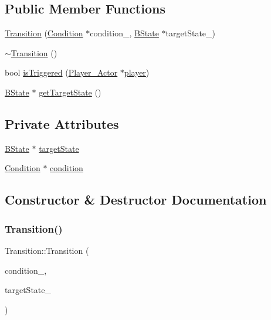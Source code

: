 \subsection*{Public Member Functions}
\begin{DoxyCompactItemize}
\item 
\hyperlink{classTransition_a6997753f6e393f5ec99fbabd693ad78e}{Transition} (\hyperlink{classCondition}{Condition} $\ast$condition\+\_\+, \hyperlink{classBState}{B\+State} $\ast$target\+State\+\_\+)
\item 
\hyperlink{classTransition_ab66e8623f23c71cd4f07c69596427bab}{$\sim$\+Transition} ()
\item 
bool \hyperlink{classTransition_a9c527feeff2364f489b022de20f8cc2d}{is\+Triggered} (\hyperlink{classPlayer__Actor}{Player\+\_\+\+Actor} $\ast$\hyperlink{game__play__state_8cpp_ac65a4bc85dcd7c1cefbc84425f42fc46}{player})
\item 
\hyperlink{classBState}{B\+State} $\ast$ \hyperlink{classTransition_adf0f4f0f2db192bb9fd83ba5e067e0e6}{get\+Target\+State} ()
\end{DoxyCompactItemize}
\subsection*{Private Attributes}
\begin{DoxyCompactItemize}
\item 
\hyperlink{classBState}{B\+State} $\ast$ \hyperlink{classTransition_a076da5d4696dc601774c5f8967b591e7}{target\+State}
\item 
\hyperlink{classCondition}{Condition} $\ast$ \hyperlink{classTransition_a58c79ffaf550ab045550fb4064da5317}{condition}
\end{DoxyCompactItemize}


\subsection{Constructor \& Destructor Documentation}
\mbox{\label{classTransition_a6997753f6e393f5ec99fbabd693ad78e}} 
\subsubsection{\texorpdfstring{Transition()}{Transition()}}
{\footnotesize\ttfamily Transition\+::\+Transition (\begin{DoxyParamCaption}\item[{\hyperlink{classCondition}{Condition} $\ast$}]{condition\+\_\+,  }\item[{\hyperlink{classBState}{B\+State} $\ast$}]{target\+State\+\_\+ }\end{DoxyParamCaption})}

